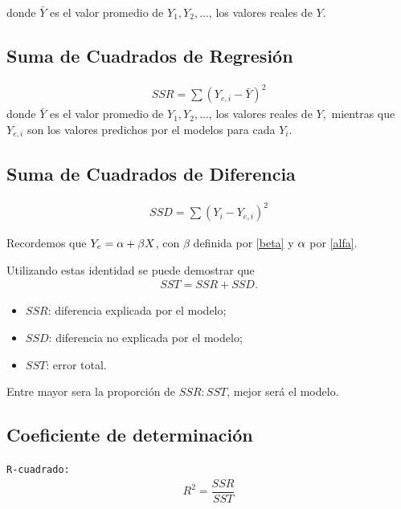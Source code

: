 donde $\bar{Y}$ es el valor promedio de $Y_{1}, Y_{2},...$, los valores reales de $Y.$


\subsection{Suma de Cuadrados de Regresión}

\begin{align}
	SSR = \sum\left( Y_{e,i}-\bar{Y} \right)^{2}
\end{align}
donde $\bar{Y}$ es el valor promedio de $Y_{1}, Y_{2},...$, los valores reales de $Y,$ mientras que $Y_{e,i}$ son los valores predichos por el modelos para cada $Y_{i}.$


\subsection{Suma de Cuadrados de Diferencia}
\begin{align}
	SSD = \sum\left( Y_{i}-Y_{e,i} \right)^{2}
\end{align}



Recordemos que $Y_{e}=\alpha + \beta X$, con $\beta$ definida por \eqref{beta} y $\alpha$ por \eqref{alfa}.



Utilizando estas identidad se puede demostrar que
\begin{align}
	SST = SSR +SSD.
\end{align}



\begin{itemize}
	\item $SSR$: diferencia explicada por el modelo;
	\item $SSD$: diferencia no explicada por el modelo;
	\item $SST$: error total.
\end{itemize}




\begin{observacion}
	Entre mayor sera la proporción de $SSR:SST$, mejor será el modelo.
\end{observacion}


\subsection{Coeficiente de determinación}
\texttt{R-cuadrado: }
\begin{align}
	R^{2}=\dfrac{SSR}{SST}
\end{align}


